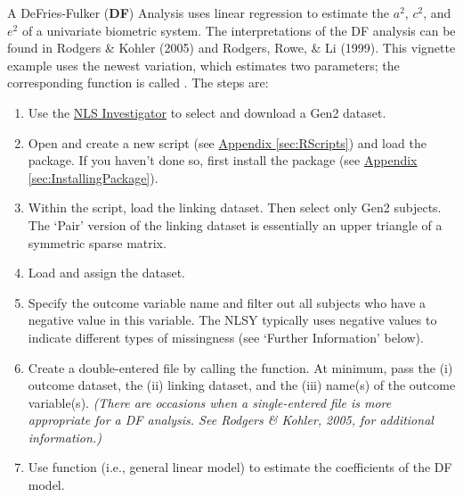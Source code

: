 \documentclass[letterpaper]{article}\usepackage{graphicx, color}
\begin{document}
A DeFries-Fulker (\textbf{DF}) Analysis uses linear regression to estimate the $a^2$, $c^2$, and $e^2$ of a univariate biometric system.  The interpretations of the DF analysis can be found in Rodgers \& Kohler (2005) and Rodgers, Rowe, \& Li (1999).  This  vignette example uses the newest variation, which estimates two parameters; the corresponding function is called .
The steps are:
\begin{enumerate}
\item Use the \hyperref[term:NlsInvestigator]{NLS Investigator} to select and download a Gen2 dataset.  

\item Open \R{} and create a new script (see \hyperref[sec:RScripts]{Appendix \ref*{sec:RScripts}}) and load the  package.  If you haven't done so, first install the  package (see \hyperref[sec:InstallingPackage]{Appendix \ref*{sec:InstallingPackage}}).
\item Within the \R{} script, load the linking dataset.  Then select only Gen2 subjects.  The `Pair' version of the linking dataset is essentially an upper triangle of a symmetric sparse matrix.
\item Load and assign the  dataset.
\item Specify the outcome variable name and filter out all subjects who have a negative value in this variable.  The NLSY typically uses negative values to indicate different types of missingness (see `Further Information' below).   
\item Create a double-entered file by calling the  function.  At minimum, pass the (i) outcome dataset, the (ii) linking dataset, and the (iii) name(s) of the outcome variable(s).  \emph{(There are occasions when a single-entered file is more appropriate for a DF analysis.  See Rodgers \& Kohler, 2005, for additional information.)}
\item Use  function (i.e., general linear model) to estimate the coefficients of the DF model.  
\end{enumerate}
\end{document}
